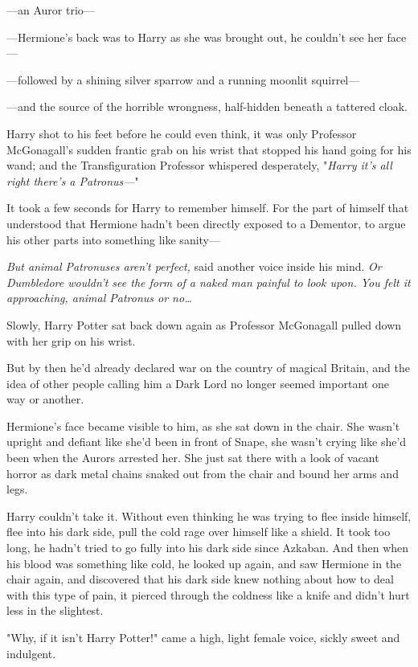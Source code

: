 ---an Auror trio---

---Hermione's back was to Harry as she was brought out, he couldn't see her 
face---

---followed by a shining silver sparrow and a running moonlit squirrel---

---and the source of the horrible wrongness, half-hidden beneath a tattered 
cloak.

Harry shot to his feet before he could even think, it was only Professor 
McGonagall's sudden frantic grab on his wrist that stopped his hand going for 
his wand; and the Transfiguration Professor whispered desperately, "\emph{Harry 
it's all right there's a Patronus---}"

It took a few seconds for Harry to remember himself. For the part of himself 
that understood that Hermione hadn't been directly exposed to a Dementor, to 
argue his other parts into something like sanity---

\emph{But animal Patronuses aren't perfect,} said another voice inside his 
mind. \emph{Or Dumbledore wouldn't see the form of a naked man painful to look 
upon. You felt it approaching, animal Patronus or no{\ldots}}

Slowly, Harry Potter sat back down again as Professor McGonagall pulled down 
with her grip on his wrist.

But by then he'd already declared war on the country of magical Britain, and 
the idea of other people calling him a Dark Lord no longer seemed important one 
way or another.

Hermione's face became visible to him, as she sat down in the chair. She wasn't 
upright and defiant like she'd been in front of Snape, she wasn't crying like 
she'd been when the Aurors arrested her. She just sat there with a look of 
vacant horror as dark metal chains snaked out from the chair and bound her arms 
and legs.

Harry couldn't take it. Without even thinking he was trying to flee inside 
himself, flee into his dark side, pull the cold rage over himself like a 
shield. It took too long, he hadn't tried to go fully into his dark side since 
Azkaban. And then when his blood was something like cold, he looked up again, 
and saw Hermione in the chair again, and discovered that his dark side knew 
nothing about how to deal with this type of pain, it pierced through the 
coldness like a knife and didn't hurt less in the slightest.

"Why, if it isn't Harry Potter!" came a high, light female voice, sickly sweet 
and indulgent.

